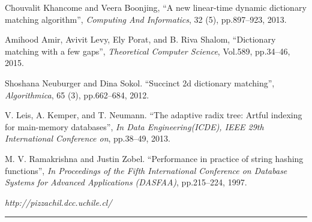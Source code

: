 \documentclass{article}
\begin{document}
\begin{thebibliography}{99}
 Chouvalit Khancome and Veera Boonjing, ``A new
  linear-time dynamic dictionary matching algorithm'', {\it Computing
    And Informatics}, 32 (5), pp.897–923, 2013.

 Amihood Amir, Avivit Levy, Ely Porat, and B. Riva
  Shalom, ``Dictionary matching with a few gaps'', {\it Theoretical
    Computer Science}, Vol.589, pp.34–46, 2015.

 Shoshana Neuburger and Dina Sokol. ``Succinct
  2d dictionary matching'', {\it Algorithmica}, 65 (3), pp.662–684,
  2012.

 V. Leis, A. Kemper, and T. Neumann. ``The adaptive
  radix tree: Artful indexing for main-memory databases'', {\it In
    Data Engineering(ICDE), IEEE 29th International Conference on},
  pp.38–49, 2013.

 M. V. Ramakrishna and Justin
  Zobel. ``Performance in practice of string hashing functions'', {\it
    In Proceedings of the Fifth International Conference on Database
    Systems for Advanced Applications (DASFAA)}, pp.215–224, 1997.

 {\it http://pizzachil.dcc.uchile.cl/}

\end{thebibliography}  


\vspace*{-0.01in}
\noindent
\rule{12.6cm}{.1mm}
\end{document}
